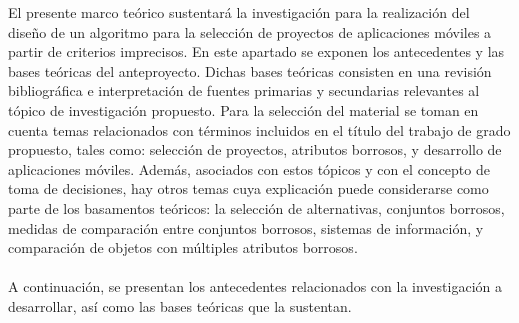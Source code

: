 El presente marco teórico sustentará la investigación para la realización del diseño de un algoritmo para la selección de proyectos de aplicaciones móviles a partir de criterios imprecisos. En este apartado se exponen los antecedentes y las bases teóricas del anteproyecto. Dichas bases teóricas consisten en una revisión bibliográfica e interpretación de fuentes primarias y secundarias relevantes al tópico de investigación propuesto.  Para la selección del material se toman en cuenta temas relacionados con términos incluidos en el título del trabajo de grado propuesto, tales como: selección de proyectos, atributos borrosos, y desarrollo de aplicaciones móviles. Además, asociados con estos tópicos y con el concepto de toma de decisiones, hay otros temas cuya explicación puede considerarse como parte de los basamentos teóricos: la selección de alternativas, conjuntos borrosos, medidas de comparación entre conjuntos borrosos, sistemas de información, y comparación de objetos con múltiples atributos borrosos.\\
\\
A continuación, se presentan los antecedentes relacionados con la investigación a desarrollar, así como las bases teóricas que la sustentan.

